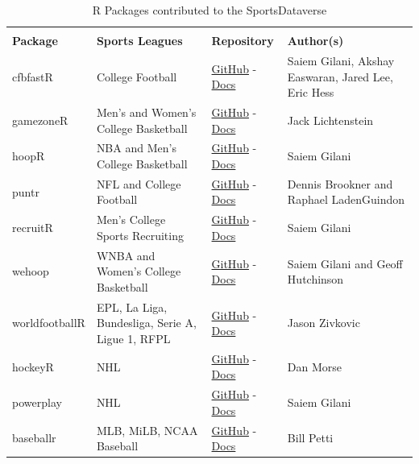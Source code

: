 \documentclass[12pt]{article}
\begin{document}
\begin{table}[!htbp]
\centering
\renewcommand{\arraystretch}{1.3}
\begin{tabular}{>{\raggedright}m{1.0in} >{\raggedright}m{2.2in} >{\centering}m{0.8in} >{\raggedright\arraybackslash}m{2.0in}}
\toprule
\multicolumn{4}{c}{\textbf{R Packages in the SportsDataverse}} \\
\textbf{Package} & \textbf{Sports Leagues} & \textbf{Repository} & \textbf{Author(s)} \\ 
 \midrule
    cfbfastR & College Football & \href{https://github.com/saiemgilani/cfbfastR/}{GitHub} - \href{https://saiemgilani.github.io/cfbfastR/}{Docs} & Saiem Gilani, Akshay Easwaran, Jared Lee, Eric Hess \\
    gamezoneR  & Men's and Women's College Basketball & \href{https://github.com/jacklich10/gamezoneR/}{GitHub} - \href{https://jacklich10.github.io/gamezoneR/}{Docs} & Jack Lichtenstein \\
    hoopR & NBA and Men's College Basketball & \href{https://github.com/saiemgilani/hoopR/}{GitHub} - \href{https://hoopR.sportsdataverse.org}{Docs} & Saiem Gilani \\
    puntr & NFL and College Football & \href{https://github.com/Puntalytics/puntr}{GitHub} - \href{https://puntalytics.github.io/puntr/}{Docs} & Dennis Brookner and Raphael LadenGuindon \\
    recruitR & Men's College Sports Recruiting & \href{https://github.com/saiemgilani/recruitR/}{GitHub} - \href{https://saiemgilani.github.io/recruitR/}{Docs} & Saiem Gilani \\
    wehoop & WNBA and Women's College Basketball & \href{https://github.com/saiemgilani/wehoop}{GitHub} - \href{https://wehoop.sportsdataverse.org}{Docs} & Saiem Gilani and Geoff Hutchinson \\
    worldfootballR & EPL, La Liga, Bundesliga, Serie A, Ligue 1, RFPL & \href{https://github.com/JaseZiv/worldfootballR}{GitHub} - \href{https://jaseziv.github.io/worldfootballR}{Docs} & Jason Zivkovic \\
    hockeyR & NHL & \href{https://github.com/danmorse314/hockeyR/}{GitHub} - \href{https://hockeyr.netlify.app/}{Docs} & Dan Morse \\
    powerplay & NHL & \href{https://github.com/saiemgilani/powerplay}{GitHub} - \href{https://saiemgilani.github.io/powerplay}{Docs} & Saiem Gilani \\
    baseballr & MLB, MiLB, NCAA Baseball & \href{https://github.com/BillPetti/baseballr/}{GitHub} - \href{https://BillPetti.github.io/baseballr}{Docs} & Bill Petti \\
\bottomrule 
\end{tabular}
\vspace{5pt}
\caption{R Packages contributed to the SportsDataverse}
\label{tbl:sdvr}
\vspace{-7mm}
\end{table}
\end{document}
